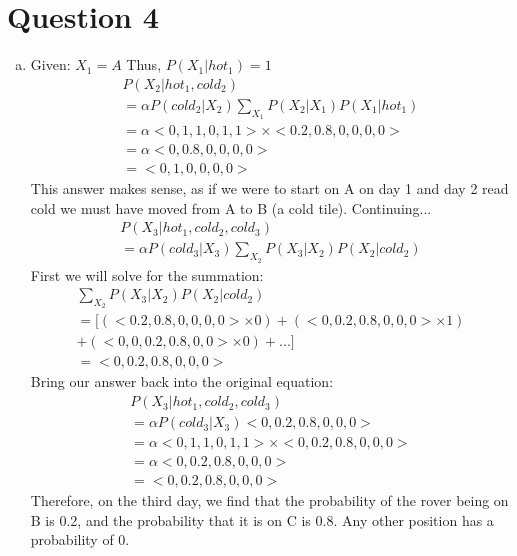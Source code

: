 \documentclass{article}
\begin{document}
\section*{Question 4}
\begin{enumerate}[a)]
    \item Given: $X_1 = A$ Thus, $P(X_1 | hot_1) = 1$
    \begin{gather*}
        P(X_2 | hot_1, cold_2) \\
        = \alpha P(cold_2 | X_2) \sum_{X_1} P(X_2|X_1)P(X_1|hot_1)\\
        = \alpha <0, 1, 1, 0, 1, 1> \times <0.2, 0.8, 0, 0, 0, 0>\\
        = \alpha <0, 0.8, 0, 0, 0, 0> \\
        = <0, 1, 0, 0, 0, 0>
    \end{gather*}
    This answer makes sense, as if we were to start on A on day 1 and day 2 read cold we must have
    moved from A to B (a cold tile). Continuing...
    \begin{gather*}
        P(X_3|hot_1,cold_2,cold_3) \\
        = \alpha P(cold_3|X_3)\sum_{X_2}P(X_3|X_2)P(X_2|cold_2)
    \end{gather*}
    First we will solve for the summation:
    \begin{gather*}
        \sum_{X_2}P(X_3|X_2)P(X_2|cold_2) \\
        = [(<0.2, 0.8, 0, 0, 0, 0> \times 0) + (<0,0.2,0.8,0,0,0> \times 1) \\ 
            + (<0, 0, 0.2, 0.8, 0, 0> \times 0) + ...] \\
        = <0, 0.2, 0.8, 0, 0, 0>
    \end{gather*}
    Bring our answer back into the original equation:
    \begin{gather*}
        P(X_3 | hot_1, cold_2, cold_3) \\
        = \alpha P(cold_3 | X_3) <0, 0.2, 0.8, 0, 0, 0> \\
        = \alpha <0, 1, 1, 0, 1, 1> \times <0, 0.2, 0.8, 0, 0, 0>\\
        = \alpha <0, 0.2, 0.8, 0, 0, 0>\\
        = <0, 0.2, 0.8, 0, 0, 0>
    \end{gather*}
    Therefore, on the third day, we find that the probability of the rover being on B is 0.2, and
    the probability that it is on C is 0.8. Any other position has a probability of 0.
    

\end{enumerate}
\end{document}
